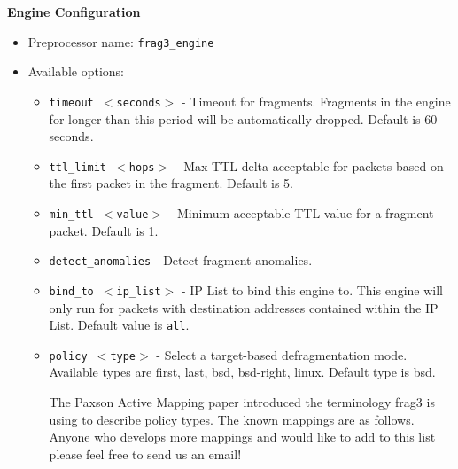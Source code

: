 \documentclass[english]{report}
\begin{document}
\textbf{Engine Configuration}
\begin{itemize}
\item Preprocessor name: \texttt{frag3\_engine}
\item Available options:
  \begin{itemize}
  \item   \texttt{timeout $<$seconds$>$} - Timeout for fragments.  Fragments in the engine for 
                         longer than this period will be automatically dropped.
                         Default is 60 seconds.
                         
  \item   \texttt{ttl\_limit $<$hops$>$} - Max TTL delta acceptable for packets based on the first
                        packet in the fragment.  Default is 5.
                        
  \item   \texttt{min\_ttl $<$value$>$} - Minimum acceptable TTL value for a fragment packet.  
                       Default is 1.
                       
  \item  \texttt{detect\_anomalies} - Detect fragment anomalies.
     
   \item  \texttt{bind\_to $<$ip\_list$>$} - IP List to bind this engine to.  This engine will only
                         run for packets with destination addresses contained
                         within the IP List.  Default value is \texttt{all}.
                         
   \item \texttt{policy $<$type$>$} - Select a target-based defragmentation mode.  Available 
                     types are first, last, bsd, bsd-right, linux.  Default
                     type is bsd.

                     The Paxson Active Mapping paper introduced the terminology
                     frag3 is using to describe policy types.  The known 
                     mappings are as follows.  Anyone who develops more 
                     mappings and would like to add to this list please feel
                     free to send us an email!
                     

\end{itemize}
\end{itemize}
\end{document}
